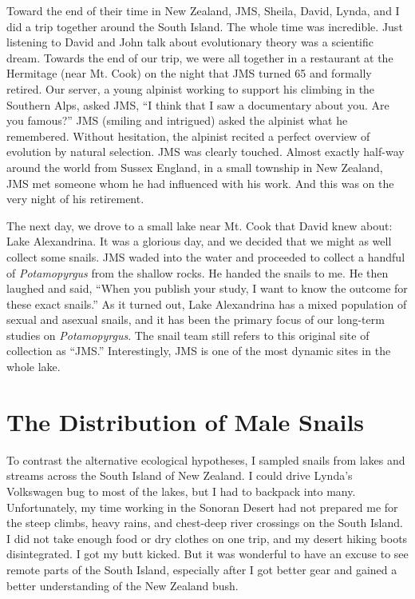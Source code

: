 \documentclass[
  letterpaper,
]{book}
\begin{document}
Toward the end of their time in New Zealand, JMS, Sheila, David, Lynda,
and I did a trip together around the South Island. The whole time was
incredible. Just listening to David and John talk about evolutionary
theory was a scientific dream. Towards the end of our trip, we were all
together in a restaurant at the Hermitage (near Mt. Cook) on the night
that JMS turned 65 and formally retired. Our server, a young alpinist
working to support his climbing in the Southern Alps, asked JMS, ``I
think that I saw a documentary about you. Are you famous?'' JMS (smiling
and intrigued) asked the alpinist what he remembered. Without
hesitation, the alpinist recited a perfect overview of evolution by
natural selection. JMS was clearly touched. Almost exactly half-way
around the world from Sussex England, in a small township in New
Zealand, JMS met someone whom he had influenced with his work. And this
was on the very night of his retirement.

The next day, we drove to a small lake near Mt. Cook that David knew
about: Lake Alexandrina. It was a glorious day, and we decided that we
might as well collect some snails. JMS waded into the water and
proceeded to collect a handful of \emph{Potamopyrgus} from the shallow
rocks. He handed the snails to me. He then laughed and said, ``When you
publish your study, I want to know the outcome for these exact snails.''
As it turned out, Lake Alexandrina has a mixed population of sexual and
asexual snails, and it has been the primary focus of our long-term
studies on \emph{Potamopyrgus}. The snail team still refers to this
original site of collection as ``JMS.'' Interestingly, JMS is one of the
most dynamic sites in the whole lake.

\hypertarget{the-distribution-of-male-snails}{%
\section{The Distribution of Male
Snails}\label{the-distribution-of-male-snails}}

To contrast the alternative ecological hypotheses, I sampled snails from
lakes and streams across the South Island of New Zealand. I could drive
Lynda's Volkswagen bug to most of the lakes, but I had to backpack into
many. Unfortunately, my time working in the Sonoran Desert had not
prepared me for the steep climbs, heavy rains, and chest-deep river
crossings on the South Island. I did not take enough food or dry clothes
on one trip, and my desert hiking boots disintegrated. I got my butt
kicked. But it was wonderful to have an excuse to see remote parts of
the South Island, especially after I got better gear and gained a better
understanding of the New Zealand bush.
\end{document}
